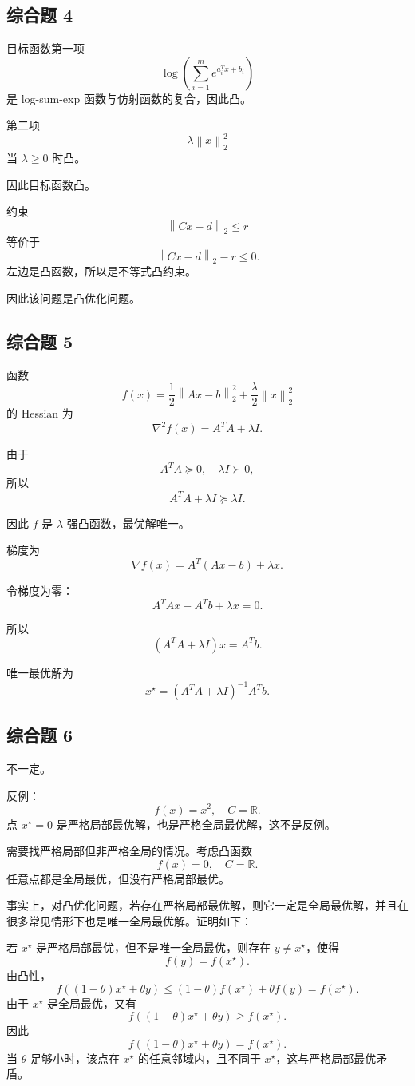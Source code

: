 \documentclass[11pt,a4paper]{ctexart}
\newcommand{\R}{\mathbb{R}}
\newcommand{\norm}[1]{\left\lVert #1 \right\rVert}
\theoremstyle{definition}
\theoremstyle{plain}
\theoremstyle{remark}
\begin{document}
\subsection*{综合题 4}

目标函数第一项
\[
    \log\left(\sum_{i=1}^m e^{a_i^Tx+b_i}\right)
\]
是 log-sum-exp 函数与仿射函数的复合，因此凸。

第二项
\[
    \lambda\norm{x}_2^2
\]
当 $\lambda\ge0$ 时凸。

因此目标函数凸。

约束
\[
    \norm{Cx-d}_2\le r
\]
等价于
\[
    \norm{Cx-d}_2-r\le0.
\]
左边是凸函数，所以是不等式凸约束。

因此该问题是凸优化问题。

\subsection*{综合题 5}

函数
\[
    f(x)=\frac12\norm{Ax-b}_2^2+\frac{\lambda}{2}\norm{x}_2^2
\]
的 Hessian 为
\[
    \nabla^2 f(x)=A^TA+\lambda I.
\]

由于
\[
    A^TA\succeq0,\quad \lambda I\succ0,
\]
所以
\[
    A^TA+\lambda I\succeq \lambda I.
\]

因此 $f$ 是 $\lambda$-强凸函数，最优解唯一。

梯度为
\[
    \nabla f(x)=A^T(Ax-b)+\lambda x.
\]

令梯度为零：
\[
    A^TAx-A^Tb+\lambda x=0.
\]

所以
\[
    (A^TA+\lambda I)x=A^Tb.
\]

唯一最优解为
\[
    x^\star=(A^TA+\lambda I)^{-1}A^Tb.
\]

\subsection*{综合题 6}

不一定。

反例：
\[
    f(x)=x^2,\quad C=\R.
\]
点 $x^\star=0$ 是严格局部最优解，也是严格全局最优解，这不是反例。

需要找严格局部但非严格全局的情况。考虑凸函数
\[
    f(x)=0,\quad C=\R.
\]
任意点都是全局最优，但没有严格局部最优。

事实上，对凸优化问题，若存在严格局部最优解，则它一定是全局最优解，并且在很多常见情形下也是唯一全局最优解。证明如下：

若 $x^\star$ 是严格局部最优，但不是唯一全局最优，则存在 $y\neq x^\star$，使得
\[
    f(y)=f(x^\star).
\]
由凸性，
\[
    f((1-\theta)x^\star+\theta y)
    \le
    (1-\theta)f(x^\star)+\theta f(y)
    =
    f(x^\star).
\]
由于 $x^\star$ 是全局最优，又有
\[
    f((1-\theta)x^\star+\theta y)\ge f(x^\star).
\]
因此
\[
    f((1-\theta)x^\star+\theta y)=f(x^\star).
\]
当 $\theta$ 足够小时，该点在 $x^\star$ 的任意邻域内，且不同于 $x^\star$，这与严格局部最优矛盾。
\end{document}
